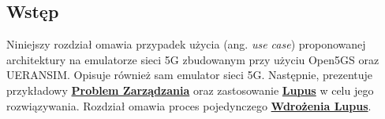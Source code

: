 \subsection{Wstęp}

Niniejszy rozdział omawia przypadek użycia (ang. \textit{use case}) proponowanej architektury na emulatorze sieci 5G zbudowanym przy użyciu Open5GS oraz UERANSIM. Opisuje również sam emulator sieci 5G. Następnie, prezentuje przykładowy \hyperlink{def:problem-zarzadzania}{\textbf{Problem Zarządzania}} oraz zastosowanie \hyperlink{def:lupus}{\textbf{Lupus}} w celu jego rozwiązywania. Rozdział omawia proces pojedynczego \hyperlink{def:wdrozenie-lupus}{\textbf{Wdrożenia Lupus}}.
